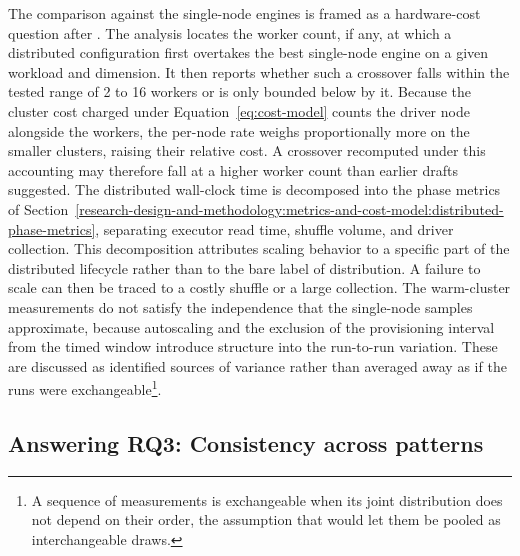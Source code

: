 The comparison against the single-node engines is framed as a hardware-cost question after \textcite{mcsherry2015_scalability_but_at_what_cost}. The analysis locates the worker count, if any, at which a distributed configuration first overtakes the best single-node engine on a given workload and dimension. It then reports whether such a crossover falls within the tested range of \num{2} to \num{16} workers or is only bounded below by it. Because the cluster cost charged under Equation~\ref{eq:cost-model} counts the driver node alongside the workers, the per-node rate weighs proportionally more on the smaller clusters, raising their relative cost. A crossover recomputed under this accounting may therefore fall at a higher worker count than earlier drafts suggested. The distributed wall-clock time is decomposed into the phase metrics of Section~\ref{research-design-and-methodology:metrics-and-cost-model:distributed-phase-metrics}, separating executor read time, shuffle volume, and driver collection. This decomposition attributes scaling behavior to a specific part of the distributed lifecycle rather than to the bare label of distribution. A failure to scale can then be traced to a costly shuffle or a large collection. The warm-cluster measurements do not satisfy the independence that the single-node samples approximate, because autoscaling and the exclusion of the provisioning interval from the timed window introduce structure into the run-to-run variation. These are discussed as identified sources of variance rather than averaged away as if the runs were exchangeable\footnote{A sequence of measurements is exchangeable when its joint distribution does not depend on their order, the assumption that would let them be pooled as interchangeable draws.}.

\subsection{Answering RQ3: Consistency across patterns}
\label{research-design-and-methodology:statistical-analysis:answering-rq3-consistency-across-patterns}

